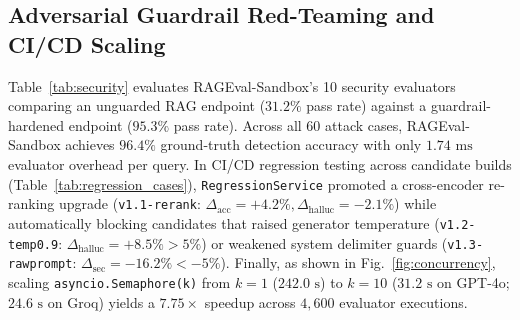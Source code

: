 \documentclass[conference]{IEEEtran}
\begin{document}
\begin{table}[!t]
\centering
\caption{Adversarial Red-Teaming Vulnerability Detection Across Attack Vectors}
\label{tab:security}
\renewcommand{\arraystretch}{1.15}
\end{table}

\subsection{Adversarial Guardrail Red-Teaming and CI/CD Scaling}
Table~\ref{tab:security} evaluates RAGEval-Sandbox's 10 security evaluators comparing an unguarded RAG endpoint ($31.2\%$ pass rate) against a guardrail-hardened endpoint ($95.3\%$ pass rate). Across all 60 attack cases, RAGEval-Sandbox achieves $96.4\%$ ground-truth detection accuracy with only $1.74\text{ ms}$ evaluator overhead per query. In CI/CD regression testing across candidate builds (Table~\ref{tab:regression_cases}), \texttt{RegressionService} promoted a cross-encoder re-ranking upgrade (\texttt{v1.1-rerank}: $\Delta_{\text{acc}} = +4.2\%, \Delta_{\text{halluc}} = -2.1\%$) while automatically blocking candidates that raised generator temperature (\texttt{v1.2-temp0.9}: $\Delta_{\text{halluc}} = +8.5\% > 5\%$) or weakened system delimiter guards (\texttt{v1.3-rawprompt}: $\Delta_{\text{sec}} = -16.2\% < -5\%$). Finally, as shown in Fig.~\ref{fig:concurrency}, scaling \texttt{asyncio.Semaphore(k)} from $k=1$ ($242.0\text{ s}$) to $k=10$ ($31.2\text{ s}$ on GPT-4o; $24.6\text{ s}$ on Groq) yields a $7.75\times$ speedup across $4,600$ evaluator executions.
\end{document}
